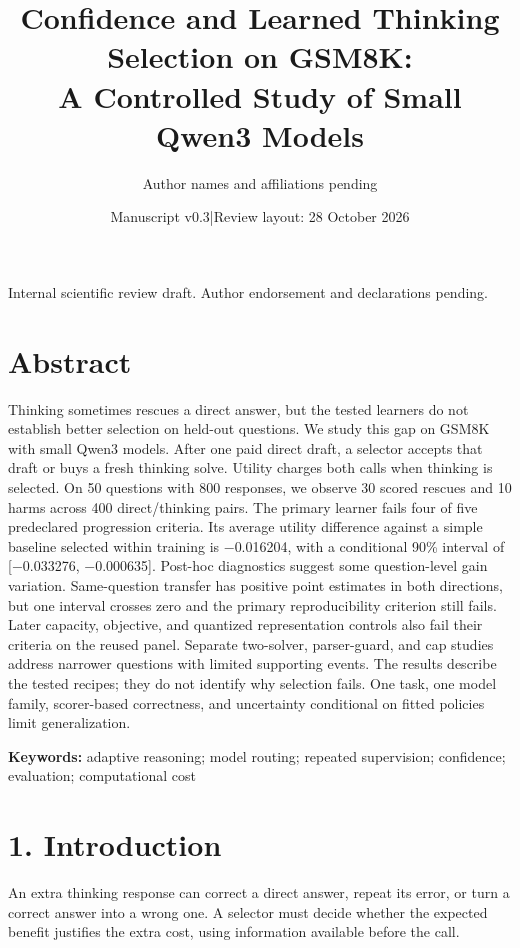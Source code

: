 \documentclass[11pt,a4paper]{article}
\title{Confidence and Learned Thinking Selection on GSM8K:\\ A Controlled Study of Small Qwen3 Models}
\author{Author names and affiliations pending}
\date{Manuscript v0.3\quad |\quad Review layout: 28 October 2026}
\begin{document}
\maketitle
\begin{center}\small Internal scientific review draft. Author endorsement and declarations pending.\end{center}
\linenumbers
\section*{Abstract}\label{sec:abstract}
Thinking sometimes rescues a direct answer, but the tested learners do not establish better selection on held-out questions. We study this gap on GSM8K with small Qwen3 models. After one paid direct draft, a selector accepts that draft or buys a fresh thinking solve. Utility charges both calls when thinking is selected. On 50 questions with 800 responses, we observe 30 scored rescues and 10 harms across 400 direct/thinking pairs. The primary learner fails four of five predeclared progression criteria. Its average utility difference against a simple baseline selected within training is \ensuremath{-}0.016204, with a conditional 90\% interval of [\ensuremath{-}0.033276, \ensuremath{-}0.000635]. Post-hoc diagnostics suggest some question-level gain variation. Same-question transfer has positive point estimates in both directions, but one interval crosses zero and the primary reproducibility criterion still fails. Later capacity, objective, and quantized representation controls also fail their criteria on the reused panel. Separate two-solver, parser-guard, and cap studies address narrower questions with limited supporting events. The results describe the tested recipes; they do not identify why selection fails. One task, one model family, scorer-based correctness, and uncertainty conditional on fitted policies limit generalization.

\textbf{Keywords:} adaptive reasoning; model routing; repeated supervision; confidence; evaluation; computational cost

\section*{1. Introduction}\label{sec:1-introduction}
An extra thinking response can correct a direct answer, repeat its error, or turn a correct answer into a wrong one. A selector must decide whether the expected benefit justifies the extra cost, using information available before the call.
\end{document}
